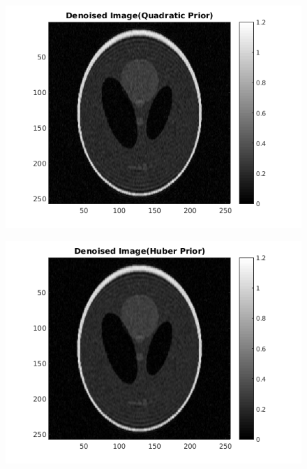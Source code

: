 \documentclass[11pt]{article}
\begin{document}
\begin{figure}[h]
\centering
\includegraphics[scale=0.5]{DenoisedQuad}
\end{figure}

\begin{figure}[h]
\centering
\includegraphics[scale=0.5]{DenoisedHuber}
\end{figure}
\end{document}
